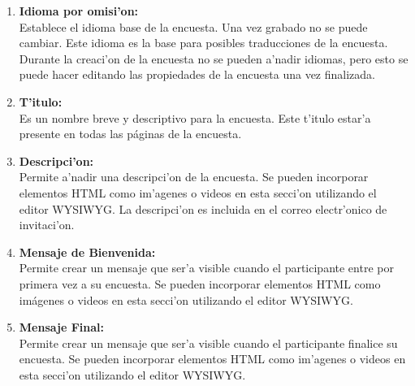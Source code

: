 \documentclass[12pt,spanish]{report}
\begin{document}
\begin{enumerate}
	\item {\bf Idioma por omisi'on:}\\ 
	Establece el idioma base de la encuesta. Una vez grabado no se puede cambiar. Este idioma es la base para posibles traducciones de la encuesta. Durante la creaci'on de la encuesta no se pueden a'nadir idiomas, pero esto se puede hacer editando las propiedades de la encuesta una vez finalizada.
	
	\item	{\bf T'itulo:}\\ 
	Es un nombre breve y descriptivo para la encuesta. Este t'itulo estar'a presente en todas las páginas de la encuesta.
	
	\item {\bf Descripci'on: }\\
	Permite a'nadir una descripci'on de la encuesta. Se pueden incorporar elementos HTML como im'agenes o videos en esta secci'on utilizando el editor WYSIWYG. La descripci'on es incluida en el correo electr'onico de invitaci'on.
	
	\item {\bf Mensaje de Bienvenida:}\\
	Permite crear un mensaje que ser'a visible cuando el participante entre por primera vez a su encuesta. Se pueden incorporar elementos HTML como imágenes o videos en esta secci'on utilizando el editor WYSIWYG.
	
	\item {\bf Mensaje Final: }\\
	Permite crear un mensaje que ser'a visible cuando el participante finalice su encuesta. Se pueden incorporar elementos HTML como im'agenes o videos en esta secci'on utilizando el editor WYSIWYG.
	

\end{enumerate}
\end{document}
